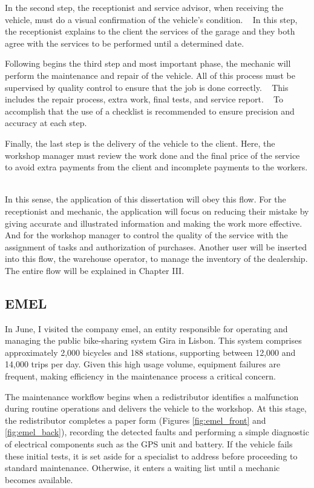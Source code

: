 In the second step, the receptionist and service advisor, when receiving the vehicle, must do a visual confirmation of the vehicle's condition. ~\cite{Setting_the_after_sale_process}
In this step, the receptionist explains to the client the services of the garage and they both agree with the services to be performed until a determined date. ~\cite{Setting_the_after_sale_process}

Following begins the third step and most important phase, the mechanic will perform the maintenance and repair of the vehicle. 
All of this process must be supervised by quality control to ensure that the job is done correctly. ~\cite{Setting_the_after_sale_process}
This includes the repair process, extra work, final tests, and service report. ~\cite{Setting_the_after_sale_process}
To accomplish that the use of a checklist is recommended to ensure precision and accuracy at each step. ~\cite{Setting_the_after_sale_process}

Finally, the last step is the delivery of the vehicle to the client. 
Here, the workshop manager must review the work done and the final price of the service to avoid extra payments from the client and incomplete payments to the workers. ~\cite{Setting_the_after_sale_process}

In this sense, the application of this dissertation will obey this flow.
For the receptionist and mechanic, the application will focus on reducing their mistake by giving accurate and illustrated information and making the work more effective.
And for the workshop manager to control the quality of the service with the assignment of tasks and authorization of purchases. 
Another user will be inserted into this flow, the warehouse operator, to manage the inventory of the dealership. 
The entire flow will be explained in Chapter III. 


\subsection{EMEL}


In June, I visited the company \ac{emel}, an entity responsible for operating and managing the public bike-sharing system Gira in Lisbon. This system comprises approximately 2,000 bicycles and 188 stations, supporting between 12,000 and 14,000 trips per day. Given this high usage volume, equipment failures are frequent, making efficiency in the maintenance process a critical concern.

The maintenance workflow begins when a redistributor identifies a malfunction during routine operations and delivers the vehicle to the workshop. At this stage, the redistributor completes a paper form (Figures \ref{fig:emel_front} and \ref{fig:emel_back}), recording the detected faults and performing a simple diagnostic of electrical components such as the GPS unit and battery. If the vehicle fails these initial tests, it is set aside for a specialist to address before proceeding to standard maintenance. Otherwise, it enters a waiting list until a mechanic becomes available.

